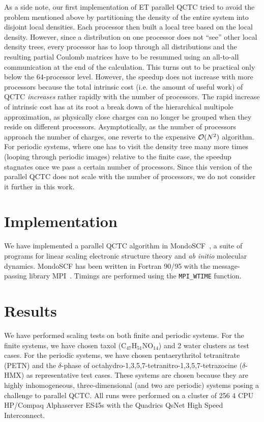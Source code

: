 \commentoutA{\documentclass[prl,aps,twocolumn,twocolumngrid,superbib]{revtex4}}
\begin{document}
As a side note, our first implementation of ET parallel QCTC tried to
avoid the problem mentioned above by partitioning the density of the
entire system into disjoint local densities. Each processor then built
a local tree based on the local density. However, since a distribution
on one processor does not ``see'' other local density trees, every
processor has to loop through all distributions and the resulting
partial Coulomb matrices have to be resummed using an all-to-all
communication at the end of the calculation. This turns out to be
practical only below the 64-processor level. However, the speedup does
not increase with more processors because the total intrinsic cost
(i.e. the amount of useful work) of QCTC {\it increases} rather
rapidly with the number of processors. The rapid increase of intrinsic
cost has at its root a break down of the hierarchical multipole
approximation, as physically close charges can no longer be grouped
when they reside on different processors.  Asymptotically, as the
number of processors approach the number of charges, one reverts to
the expensive ${\cal O}(N^2)$ algorithm.  For periodic systems, where
one has to visit the density tree many more times (looping through
periodic images) relative to the finite case, the speedup stagnates
once we pass a certain number of processors. Since this version of the
parallel QCTC does not scale with the number of processors, we do not
consider it further in this work.

\section{Implementation}
\label{sec:implementation}
We have implemented a parallel QCTC algorithm in {\sc
MondoSCF}~\cite{MondoSCF}, a suite of programs for linear scaling
electronic structure theory and {\it ab initio}\/ molecular dynamics.
{\sc MondoSCF} has been written in Fortran 90/95 with the
message-passing library MPI~\cite{mpi}.  Timings are performed using
the {\tt MPI\_WTIME} function.

\section{Results}
\label{results}
We have performed scaling tests on both finite and periodic
systems. For the finite systems, we have chosen taxol
(C$_{47}$H$_{51}$NO$_{14}$) and 2 water clusters as test cases. For
the periodic systems, we have chosen pentaerythritol tetranitrate
(PETN)\cite{CGan04A} and the $\delta$-phase of
octahydro-1,3,5,7-tetranitro-1,3,5,7-tetrazocine
($\delta$-HMX)\cite{JPLewis00} as representative test cases. These
systems are chosen because they are highly inhomogeneous,
three-dimensional (and two are periodic) systems posing a challenge to
parallel QCTC. All runs were performed on a cluster of 256 4 CPU
HP/Compaq Alphaserver ES45s with the Quadrics QsNet High Speed
Interconnect.
\end{document}
